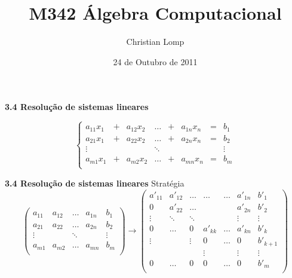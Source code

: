 \documentclass{beamer}
\title[M342]{M342 Álgebra Computacional}
\author{Christian Lomp}
\institute{FCUP}
\date{24 de Outubro de 2011}
\begin{document}
\begin{frame}
\titlepage
\end{frame}







\begin{frame}{\bf 3.4 Resolução de sistemas lineares}


$$\left\{ \begin{array}{cccccccc}
a_{11}x_1 &+& a_{12}x_2 & \ldots &+& a_{1n}x_n &=& b_1 \\
a_{21}x_1 &+& a_{22}x_2 & \ldots &+& a_{2n}x_n &=& b_2 \\
   \vdots &&           & \ddots &&           & &\vdots \\
a_{m1}x_1 &+& a_{m2}x_2 & \ldots &+& a_{mn}x_n &=& b_m \\
\end{array}\right.$$
\end{frame}


\begin{frame}{\bf 3.4 Resolução de sistemas lineares }{Stratégia}
{\small 
$$
\left( \begin{array}{cccc|l}
a_{11} & a_{12} & \ldots & a_{1n} & b_1 \\
a_{21} & a_{22} & \ldots & a_{2n} & b_2 \\
   \vdots &     & \ddots &      &\vdots \\
a_{m1} & a_{m2} & \ldots & a_{mn} & b_m \\
\end{array}\right)\rightarrow
\left( \begin{array}{cccccc|l}
a'_{11}   & a'_{12} & \ldots  & \ldots  & \ldots  & a'_{1n}  & b'_1 \\
0         & a'_{22} & \ldots  &   &   & a'_{2n}  & b'_2 \\
   \vdots & \ddots  & \ddots  &   &   &  \vdots        & \vdots \\
 0        & \ldots  &  0      & a'_{kk} & \ldots  & a'_{kn}  & b'_k \\
\vdots   &         & \vdots  & 0       & \ldots  & 0        & b'_{k+1} \\
         &         &         &  \vdots       &   &   \vdots & \vdots \\
0         & \ldots  & 0      &  0       &  \ldots       & 0         & b'_m \\
\end{array}\right)
$$}

\end{frame}
\end{document}
